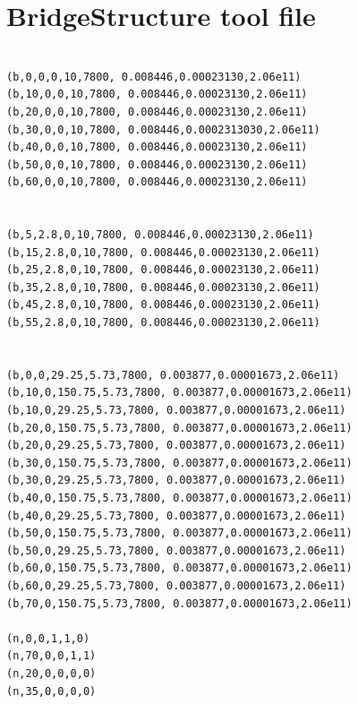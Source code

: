 \documentclass[10pt,a4paper,final]{report}
\begin{document}
\section{BridgeStructure tool file}
\begin{lstlisting}

(b,0,0,0,10,7800, 0.008446,0.00023130,2.06e11)
(b,10,0,0,10,7800, 0.008446,0.00023130,2.06e11)
(b,20,0,0,10,7800, 0.008446,0.00023130,2.06e11)
(b,30,0,0,10,7800, 0.008446,0.0002313030,2.06e11)
(b,40,0,0,10,7800, 0.008446,0.00023130,2.06e11)
(b,50,0,0,10,7800, 0.008446,0.00023130,2.06e11)
(b,60,0,0,10,7800, 0.008446,0.00023130,2.06e11)


(b,5,2.8,0,10,7800, 0.008446,0.00023130,2.06e11)
(b,15,2.8,0,10,7800, 0.008446,0.00023130,2.06e11)
(b,25,2.8,0,10,7800, 0.008446,0.00023130,2.06e11)
(b,35,2.8,0,10,7800, 0.008446,0.00023130,2.06e11)
(b,45,2.8,0,10,7800, 0.008446,0.00023130,2.06e11)
(b,55,2.8,0,10,7800, 0.008446,0.00023130,2.06e11)


(b,0,0,29.25,5.73,7800, 0.003877,0.00001673,2.06e11)
(b,10,0,150.75,5.73,7800, 0.003877,0.00001673,2.06e11)
(b,10,0,29.25,5.73,7800, 0.003877,0.00001673,2.06e11)
(b,20,0,150.75,5.73,7800, 0.003877,0.00001673,2.06e11)
(b,20,0,29.25,5.73,7800, 0.003877,0.00001673,2.06e11)
(b,30,0,150.75,5.73,7800, 0.003877,0.00001673,2.06e11)
(b,30,0,29.25,5.73,7800, 0.003877,0.00001673,2.06e11)
(b,40,0,150.75,5.73,7800, 0.003877,0.00001673,2.06e11)
(b,40,0,29.25,5.73,7800, 0.003877,0.00001673,2.06e11)
(b,50,0,150.75,5.73,7800, 0.003877,0.00001673,2.06e11)
(b,50,0,29.25,5.73,7800, 0.003877,0.00001673,2.06e11)
(b,60,0,150.75,5.73,7800, 0.003877,0.00001673,2.06e11)
(b,60,0,29.25,5.73,7800, 0.003877,0.00001673,2.06e11)
(b,70,0,150.75,5.73,7800, 0.003877,0.00001673,2.06e11)

(n,0,0,1,1,0) 
(n,70,0,0,1,1) 
(n,20,0,0,0,0)
(n,35,0,0,0,0)
\end{lstlisting}
\newpage
\end{document}
